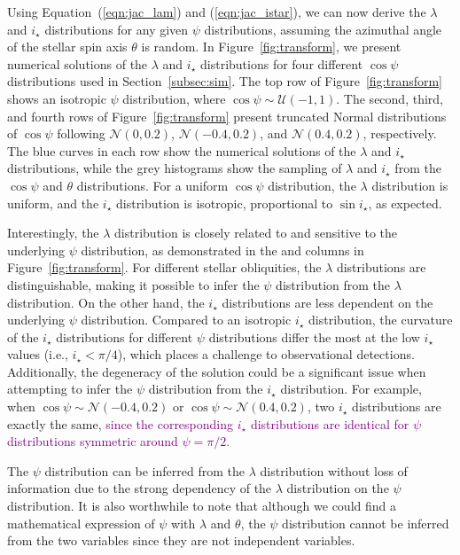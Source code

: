 \documentclass[twocolumn,times]{aastex631}
\newcommand{\edits}[1]{\textcolor{purple}{#1}}
\begin{document}
Using Equation~(\ref{eqn:jac_lam}) and (\ref{eqn:jac_istar}), we can now derive the $\lambda$ and $i_\star$ distributions for any given $\psi$ distributions, assuming the azimuthal angle of the stellar spin axis $\theta$ is random. In Figure~\ref{fig:transform}, we present numerical solutions of the $\lambda$ and $i_\star$ distributions for four different $\cos{\psi}$ distributions used in Section~\ref{subsec:sim}. The top row of Figure~\ref{fig:transform} shows an isotropic $\psi$ distribution, where $\cos{\psi} \sim \mathcal{U}(-1,1)$. The second, third, and fourth rows of Figure~\ref{fig:transform} present truncated Normal distributions of $\cos{\psi}$ following $\mathcal{N}(0,0.2)$, $\mathcal{N}(-0.4,0.2)$, and $\mathcal{N}(0.4,0.2)$, respectively.
The blue curves in each row show the numerical solutions of the $\lambda$ and $i_\star$ distributions, while the grey histograms show the sampling of $\lambda$ and $i_\star$ from the $\cos{\psi}$ and $\theta$ distributions. 
For a uniform $\cos{\psi}$ distribution, the $\lambda$ distribution is uniform, and the $i_\star$ distribution is isotropic, proportional to $\sin{i_\star}$, as expected.

Interestingly, the $\lambda$ distribution is closely related to and sensitive to the underlying $\psi$ distribution, as demonstrated in the  and  columns in Figure~\ref{fig:transform}. For different stellar obliquities, the $\lambda$ distributions are distinguishable, making it possible to infer the $\psi$ distribution from the $\lambda$ distribution. On the other hand, the $i_\star$ distributions are less dependent on the underlying $\psi$ distribution. Compared to an isotropic $i_\star$ distribution, the curvature of the $i_\star$ distributions for different $\psi$ distributions differ the most at the low $i_\star$ values (i.e., $i_\star < \pi/4$), which places a challenge to observational detections. 
Additionally, the degeneracy of the solution could be a significant issue when attempting to infer the $\psi$ distribution from the $i_\star$ distribution. For example, when $\cos{\psi} \sim \mathcal{N}(-0.4,0.2)$ or $\cos{\psi} \sim \mathcal{N}(0.4,0.2)$, two $i_\star$ distributions are exactly the same, \edits{since the corresponding $i_\star$ distributions are identical for $\psi$ distributions symmetric around $\psi = \pi/2$.}

The $\psi$ distribution can be inferred from the $\lambda$ distribution without loss of information due to the strong dependency of the $\lambda$ distribution on the $\psi$ distribution. It is also worthwhile to note that although we could find a mathematical expression of $\psi$ with $\lambda$ and $\theta$, the $\psi$ distribution cannot be inferred from the two variables since they are not independent variables.
\end{document}
